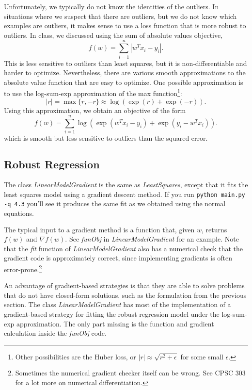 \documentclass{article}
\begin{document}
Unfortunately, we typically do not know the identities of the outliers. In situations where we suspect that there are outliers, but we do not know which examples are outliers, it makes sense to use a loss function that is more robust to outliers. In class, we discussed using the sum of absolute values objective,
\[
f(w) = \sum_{i=1}^n |w^Tx_i - y_i|.
\]
This is less sensitive to outliers than least squares, but it is non-differentiable and harder to optimize. Nevertheless, there are various smooth approximations to the absolute value function that are easy to optimize. One possible approximation is to use the log-sum-exp approximation of the max function\footnote{Other possibilities are the Huber loss, or $|r|\approx \sqrt{r^2+\epsilon}$ for some small $\epsilon$.}:
\[
|r| = \max\{r, -r\} \approx \log(\exp(r) + \exp(-r)).
\]
Using this approximation, we obtain an objective of the form
\[
f(w) {=} \sum_{i=1}^n  \log\left(\exp(w^Tx_i - y_i) + \exp(y_i - w^Tx_i)\right).
\]
which is smooth but less sensitive to outliers than the squared error. 


\subsection{Robust Regression}

The class \emph{LinearModelGradient} is the same as \emph{LeastSquares}, except that it fits the least squares model using a gradient descent method. If you run \verb|python main.py -q 4.3| you'll see it produces the same fit as we obtained using the normal equations.

The typical input to a gradient method is a function that, given $w$, returns $f(w)$ and $\nabla f(w)$. See \emph{funObj} in \emph{LinearModelGradient} for an example. Note that the \emph{fit} function of \emph{LinearModelGradient} also has a numerical check that the gradient code is approximately correct, since implementing gradients is often error-prone.\footnote{Sometimes the numerical gradient checker itself can be wrong. See CPSC 303 for a lot more on numerical differentiation.}

An advantage of gradient-based strategies is that they are able to solve
problems that do not have closed-form solutions, such as the formulation from the
previous section. The class \emph{LinearModelGradient} has most of the implementation
of a gradient-based strategy for fitting the robust regression model under the log-sum-exp approximation.
The only part missing is the function and gradient calculation inside the \emph{funObj} code.
\end{document}
